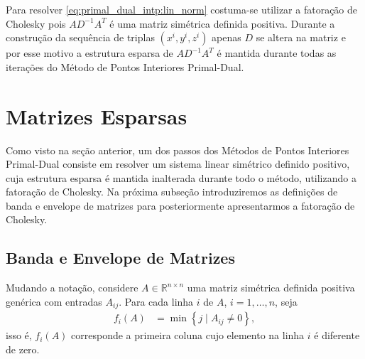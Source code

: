 Para resolver \eqref{eq:primal_dual_intp:lin_norm} costuma-se utilizar a
fatoração de Cholesky pois $A D^{-1} A^T$ é uma matriz simétrica definida
positiva. Durante a construção da sequência de triplas $(x^i, y^i, z^i)$ apenas
$D$ se altera na matriz e por esse motivo a estrutura esparsa de $A D^{-1} A^T$ é mantida
durante todas as iterações do Método de Pontos Interiores Primal-Dual.

\section{Matrizes Esparsas}
Como visto na seção anterior, um dos passos dos Métodos de Pontos Interiores
Primal-Dual consiste em resolver um sistema linear simétrico definido positivo,
cuja estrutura esparsa é mantida inalterada durante todo o método, utilizando a fatoração de
Cholesky. Na próxima subseção introduziremos as definições de banda e envelope
de matrizes para posteriormente apresentarmos a fatoração de Cholesky.

\subsection{Banda e Envelope de Matrizes}
Mudando a notação, considere $A \in \mathbb{R}^{n \times n}$ uma matriz
simétrica definida positiva genérica com entradas $A_{ij}$. Para cada linha $i$
de $A$, $i = 1, \ldots, n$, seja
\begin{align*}
    f_i(A) &= \min\left\{ j \mid A_{ij} \neq 0 \right\},
\end{align*}
isso é, $f_i(A)$ corresponde a primeira coluna cujo elemento na linha $i$ é
diferente de zero.

